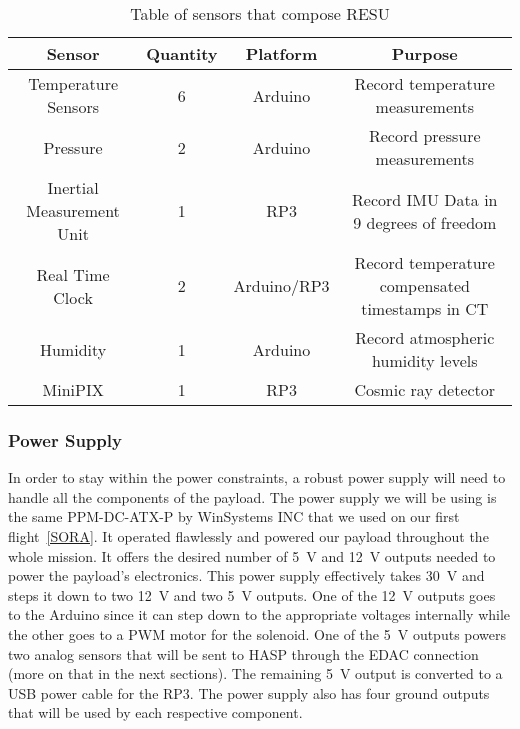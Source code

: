 \begin{table}[h!]
\centering
\caption{Table of sensors that compose RESU}
\label{tab:Sensors}
\bigskip
\begin{tabular}{|c|c|c|c|}
\hline
\multicolumn{1}{|c|}{\bfseries Sensor} & {\bfseries Quantity} & {\bfseries Platform} & {\bfseries Purpose} \\
\hline
    Temperature Sensors         	& 6 & Arduino  		& Record temperature measurements  \\ \hline
    Pressure        				& 2 & Arduino 		& Record pressure measurements \\ \hline
    Inertial Measurement Unit       & 1 & RP3    		& Record IMU Data in 9 degrees of freedom \\ \hline    
    Real Time Clock 				& 2 & Arduino/RP3 	& Record temperature compensated timestamps in CT \\\hline
    Humidity        				& 1 & Arduino 		& Record atmospheric humidity levels \\ \hline
    MiniPIX         				& 1 & RP3     		& Cosmic ray detector \\ \hline
\end{tabular}
\end{table}

\subsubsection{Power Supply}

In order to stay within the power constraints, a robust power supply will need to  handle all the components of the payload.  The power supply we will be using is the same PPM-DC-ATX-P by WinSystems INC that we used on our first flight~\ref{SORA}.  It operated flawlessly and powered our payload throughout the whole mission.  It offers the desired number of \SI{+5}{\volt} and \SI{+12}{\volt} outputs needed to power the payload's electronics.  This power supply effectively takes \SI{+30}{\volt} and steps it down to two \SI{+12}{\volt} and two \SI{+5 }{\volt} outputs.  One of the \SI{+12}{\volt} outputs goes to the Arduino since it can step down to the appropriate voltages internally while the other goes to a PWM motor for the solenoid.  One of the \SI{+5 }{\volt} outputs powers two analog sensors that will be sent to HASP through the EDAC connection (more on that in the next sections).  The remaining \SI{+5 }{\volt} output is converted to a USB power cable for the RP3.  The power supply also has four ground outputs that will be used by each respective component. 


